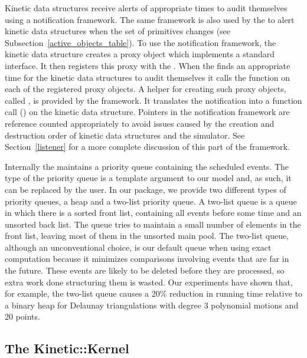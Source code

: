 Kinetic data structures receive alerts of appropriate times to audit
themselves using a notification framework. The same framework is also
used by the  to alert kinetic data
structures when the set of primitives changes (see
Subsection~\ref{active_objects_table}). To use the notification
framework, the kinetic data structure creates a proxy object which
implements a standard  interface. It then registers this
proxy with the . When the
 finds an appropriate time for the kinetic
data structures to audit themselves it calls the function
 on each of the registered proxy
objects.  A helper for creating such proxy objects, called
, is provided by the
framework. It translates the notification into a function call
() on the kinetic data structure.  Pointers in the
notification framework are reference counted appropriately to avoid
issues caused by the creation and destruction order of kinetic data
structures and the simulator. See Section~\ref{listener} for a more
complete discussion of this part of the framework.

Internally the  maintains a priority queue
containing the scheduled events. The type of the priority queue is a
template argument to our  model and, as such, it can
be replaced by the user.  In our package, we provide two different
types of priority queues, a heap and a two-list priority queue.  A
two-list queue is a queue in which there is a sorted front list,
containing all events before some time and an unsorted back list. The
queue tries to maintain a small number of elements in the front list,
leaving most of them in the unsorted main pool. The two-list queue,
although an unconventional choice, is our default queue when using
exact computation because it minimizes comparisons involving events
that are far in the future.  These events are likely to be deleted
before they are processed, so extra work done structuring them is
wasted.  Our experiments have shown that, for example, the two-list
queue causes a 20\% reduction in running time relative to a binary
heap for Delaunay triangulations with degree 3 polynomial motions and
20 points.



\subsection{The Kinetic::Kernel}

